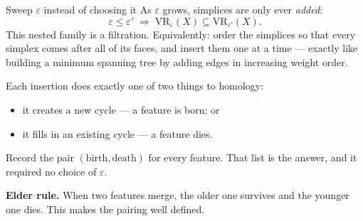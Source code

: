 \documentclass[10pt,aspectratio=169]{beamer}
\newcommand{\VR}{\mathrm{VR}}
\newcommand{\HL}[1]{\textcolor{blue!70!black}{#1}}
\begin{document}
    \begin{frame}[shrink=5]{Sweep $\varepsilon$ instead of choosing it}
        As $\varepsilon$ grows, simplices are only ever \emph{added}:
        \[
            \varepsilon\le\varepsilon' \;\Longrightarrow\; \VR_\varepsilon(X)\subseteq\VR_{\varepsilon'}(X).
        \]
        This nested family is a \HL{filtration}. Equivalently: order the simplices so that
        every simplex comes after all of its faces, and insert them one at a time --- exactly
        like building a minimum spanning tree by adding edges in increasing weight order.

        \vspace{0.7em}

        Each insertion does exactly one of two things to homology:
        \begin{itemize}
            \item it \HL{creates} a new cycle --- a feature is \alert{born}; or
            \item it \HL{fills in} an existing cycle --- a feature \alert{dies}.
        \end{itemize}

        \vspace{0.5em}
        Record the pair $(\text{birth},\text{death})$ for every feature. That list is the
        answer, and it required no choice of $\varepsilon$.

        \vspace{0.5em}

        \textbf{Elder rule.} When two features merge, the older one survives and the younger
        one dies. This makes the pairing well defined.
    \end{frame}
\end{document}
